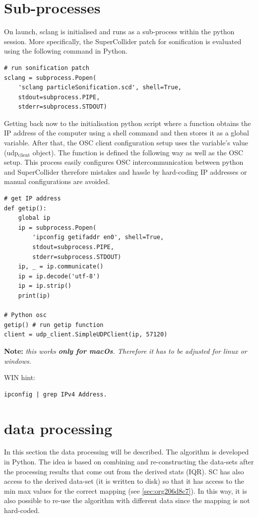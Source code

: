 \documentclass[11pt]{article}
\begin{document}
\section{Sub-processes}
\label{sec:orgd727bb3}
On launch, sclang is initialised and runs as a sub-process within the python session.  More specifically, the SuperCollider  patch for sonification is evaluated using the following command in Python.
\begin{verbatim}
# run sonification patch
sclang = subprocess.Popen(
    'sclang particleSonification.scd', shell=True,
    stdout=subprocess.PIPE,
    stderr=subprocess.STDOUT)
\end{verbatim}
Getting back now to the initialisation python script where a function obtains the IP address of the computer using a shell command and then stores it as a global variable.  After that, the OSC client configuration setup uses the variable's value (udp\(_{\text{client}}\) object).  The function is defined the following way as well as the OSC setup.  This process easily configures OSC intercommunication between python and SuperCollider therefore mistakes and hassle by hard-coding IP addresses or manual configurations are avoided.

\begin{verbatim}
# get IP address
def getip():
    global ip
    ip = subprocess.Popen(
        'ipconfig getifaddr en0', shell=True,
        stdout=subprocess.PIPE,
        stderr=subprocess.STDOUT)
    ip, _ = ip.communicate()
    ip = ip.decode('utf-8')
    ip = ip.strip()
    print(ip)

# Python osc
getip() # run getip function
client = udp_client.SimpleUDPClient(ip, 57120)
\end{verbatim}
\textbf{Note:} \emph{this works \textbf{only for macOs}.  Therefore it has to be adjusted for linux or windows.}

\vspace{0.2cm}
\noindent
WIN hint:
\begin{verbatim}
ipconfig | grep IPv4 Address.
\end{verbatim}

\section{data processing}
\label{sec:org0414196}
In this section the data processing will be described.  The algorithm is developed in Python.  The idea is based on combining and re-constructing the data-sets after the processing results that come out from the derived stats (IQR).  SC has also access to the derived data-set (it is written to disk) so that it has access to the min max values for the correct mapping (see \ref{sec:org206d8c7}).  In this way, it is also possible to re-use the algorithm with different data since the mapping is not hard-coded.
\end{document}
